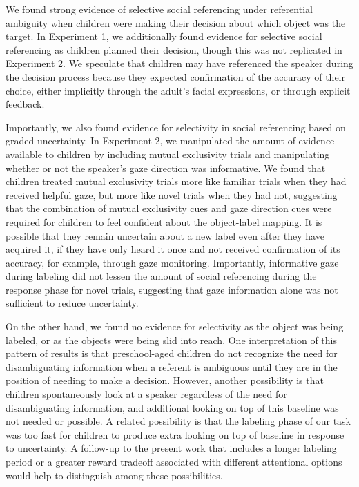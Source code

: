\documentclass[10pt, letterpaper]{article}
\begin{document}
We found strong evidence of selective social referencing under
referential ambiguity when children were making their decision about
which object was the target. In Experiment 1, we additionally found
evidence for selective social referencing as children planned their
decision, though this was not replicated in Experiment 2. We speculate
that children may have referenced the speaker during the decision
process because they expected confirmation of the accuracy of their
choice, either implicitly through the adult's facial expressions, or
through explicit feedback.

Importantly, we also found evidence for selectivity in social
referencing based on graded uncertainty. In Experiment 2, we manipulated
the amount of evidence available to children by including mutual
exclusivity trials and manipulating whether or not the speaker's gaze
direction was informative. We found that children treated mutual
exclusivity trials more like familiar trials when they had received
helpful gaze, but more like novel trials when they had not, suggesting
that the combination of mutual exclusivity cues and gaze direction cues
were required for children to feel confident about the object-label
mapping. It is possible that they remain uncertain about a new label
even after they have acquired it, if they have only heard it once and
not received confirmation of its accuracy, for example, through gaze
monitoring. Importantly, informative gaze during labeling did not lessen
the amount of social referencing during the response phase for novel
trials, suggesting that gaze information alone was not sufficient to
reduce uncertainty.

On the other hand, we found no evidence for selectivity as the object
was being labeled, or as the objects were being slid into reach. One
interpretation of this pattern of results is that preschool-aged
children do not recognize the need for disambiguating information when a
referent is ambiguous until they are in the position of needing to make
a decision. However, another possibility is that children spontaneously
look at a speaker regardless of the need for disambiguating information,
and additional looking on top of this baseline was not needed or
possible. A related possibility is that the labeling phase of our task
was too fast for children to produce extra looking on top of baseline in
response to uncertainty. A follow-up to the present work that includes a
longer labeling period or a greater reward tradeoff associated with
different attentional options would help to distinguish among these
possibilities.
\end{document}
